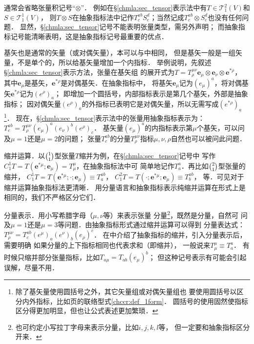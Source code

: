  通常会省略张量积记号“$\otimes$”．
例如在\S \ref{chmla:sec_tensor}表示法中有$T\in \mathcal{T}^{2}_{1}(V)$和$S\in \mathcal{T}^{1}_{1}(V)$，
则$T\otimes S$在抽象指标法中记作$T^{ab}_c S^d_e$；当然记成$T^{ab}_c\otimes S^d_e$也没有任何问题．
显然，\S \ref{chmla:sec_tensor}记号{\heiti 不能}表明张量类型，需另外声明；
而抽象指标记号{\heiti 能}清晰表明，这是抽象指标记号最重要的优点．


 基矢也是通常的矢量（或对偶矢量），本可以与中相同，
但是基矢一般是一组矢量，不是单个的，所以给基矢量增加一个内指标．
举例说明，先叙述\S \ref{chmla:sec_tensor}表示方法，张量在基矢组
的展开式为$T=T^{\mu\nu}_{\rho} \boldsymbol{e}_\mu \otimes \boldsymbol{e}_\nu \otimes \boldsymbol{e}^{*\rho}$，
其中$\boldsymbol{e}_\mu$是基矢，$\boldsymbol{e}^{*\rho}$是对偶基矢．在抽象指标中，
将基矢$\boldsymbol{e}_\mu$记为$(e_\mu)^a$，将对偶基矢$\boldsymbol{e}^{*\rho }$记为$(e^{\rho})_a$；
即增加一个圆括号，内部指标表示是第几个基矢，外部是抽象指标；
因对偶矢量$(e^{\rho})_a$的外指标已表明它是对偶矢量，所以无需写成$(e^{*\rho})_a$
{\footnote{除了基矢量使用圆括号之外，其它矢量{\kaishu 组}或对偶矢量{\kaishu 组}也
        要使用圆括号以区分内外指标，比如\pageref{chccr:def_1form}页的联络型式\eqref{chccr:def_1form}．
        圆括号的使用固然使指标区分得更加明显，但也让公式表述更加繁琐．}}．
现在，\S \ref{chmla:sec_tensor}表示法中的张量用抽象指标表示为：
$    T^{ab}_c = T^{\mu\nu}_{\rho} (e_\mu)^a (e_\nu)^b (e^{\rho})_c $．
基矢量$(e_\mu)^a$的内指标表示第$\mu$个基矢，可以问及$\mu=1$还是$\mu=2$的问题；
张量$T^{ab}_c$的分量$T^{\mu\nu}_{\rho}$指标$\mu,\nu,\rho$自然也可以被问此问题．

 缩并运算．以$\binom{1}{1}$型张量$T$缩并为例，在\S\ref{chmla:sec_tensor}记号中
写作$C^1_1 T=T(\boldsymbol{e}^{*\mu};\boldsymbol{e}_\mu)=T^\mu _\mu$，在抽象指标法中可
简单地记作$T^a_{a}$．再比如$\binom{2}{1}$型张量的缩并，
$C^1_1 T=T(\boldsymbol{e}^{*\mu};\cdot;\boldsymbol{e}_\mu)\equiv T^{ab}_a$，
$C^2_1 T=T(\cdot;\boldsymbol{e}^{*\mu};\boldsymbol{e}_\mu)\equiv T^{ab}_b$，
等．可见对于缩并运算抽象指标法更清晰．
用分量语言和抽象指标表示纯缩并运算在形式上是相同的，我们不严格区分它们．

 分量表示．用小写希腊字母（$\mu,\nu$等）来表示张量
分量{\footnote{也可约定小写拉丁字母来表示分量，比如$i,j,k,l$等，
        但一定要和抽象指标区分开来．}}，既然是分量，自然可
问及$\mu=1$还是$\mu=3$等问题．由抽象指标形式通过缩并运算可以得到
分量表达式：
$    T^{\mu\nu}_{\rho} = T^{ab}_c (e^\mu)_a (e^\nu)_b (e_{\rho})^c $．
在中介绍了抽象指标的缩并，引入分量表示后，需要明确
如果分量的上下指标相同也代表求和（即缩并），
一般说来$T^\mu _\mu \equiv T^a _a$．
有时候只缩并部分张量指标，比如$T_{a\mu}=T_{ab}(e_\mu)^b$；
但这种记号表示有可能会引起误解，尽量不用．


